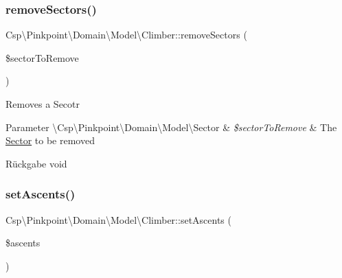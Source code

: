 \subsubsection{\texorpdfstring{remove\+Sectors()}{removeSectors()}}
{\footnotesize\ttfamily Csp\textbackslash{}\+Pinkpoint\textbackslash{}\+Domain\textbackslash{}\+Model\textbackslash{}\+Climber\+::remove\+Sectors (\begin{DoxyParamCaption}\item[{\textbackslash{}\hyperlink{classCsp_1_1Pinkpoint_1_1Domain_1_1Model_1_1Sector}{Csp\textbackslash{}\+Pinkpoint\textbackslash{}\+Domain\textbackslash{}\+Model\textbackslash{}\+Sector}}]{\$sector\+To\+Remove }\end{DoxyParamCaption})}

Removes a Secotr


\begin{DoxyParams}[1]{Parameter}
\textbackslash{}\+Csp\textbackslash{}\+Pinkpoint\textbackslash{}\+Domain\textbackslash{}\+Model\textbackslash{}\+Sector & {\em \$sector\+To\+Remove} & The \hyperlink{classCsp_1_1Pinkpoint_1_1Domain_1_1Model_1_1Sector}{Sector} to be removed \\
\hline
\end{DoxyParams}
\begin{DoxyReturn}{Rückgabe}
void 
\end{DoxyReturn}
\mbox{\label{classCsp_1_1Pinkpoint_1_1Domain_1_1Model_1_1Climber_a9f1d0f75c3e8cebcb3943cd8f5d61766}} 
\subsubsection{\texorpdfstring{set\+Ascents()}{setAscents()}}
{\footnotesize\ttfamily Csp\textbackslash{}\+Pinkpoint\textbackslash{}\+Domain\textbackslash{}\+Model\textbackslash{}\+Climber\+::set\+Ascents (\begin{DoxyParamCaption}\item[{\textbackslash{}T\+Y\+P\+O3\textbackslash{}\+C\+M\+S\textbackslash{}\+Extbase\textbackslash{}\+Persistence\textbackslash{}\+Object\+Storage}]{\$ascents }\end{DoxyParamCaption})}

